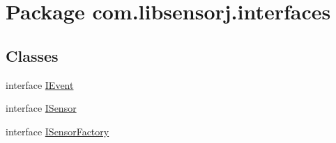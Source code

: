 \hypertarget{namespacecom_1_1libsensorj_1_1interfaces}{}\section{Package com.\+libsensorj.\+interfaces}
\label{namespacecom_1_1libsensorj_1_1interfaces}
\subsection*{Classes}
\begin{DoxyCompactItemize}
\item 
interface \hyperlink{interfacecom_1_1libsensorj_1_1interfaces_1_1IEvent}{I\+Event}
\item 
interface \hyperlink{interfacecom_1_1libsensorj_1_1interfaces_1_1ISensor}{I\+Sensor}
\item 
interface \hyperlink{interfacecom_1_1libsensorj_1_1interfaces_1_1ISensorFactory}{I\+Sensor\+Factory}
\end{DoxyCompactItemize}
